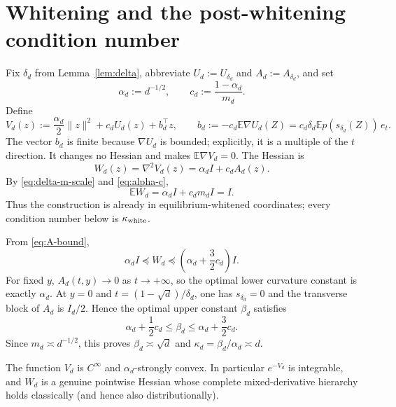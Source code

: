\documentclass[11pt]{article}
\numberwithin{equation}{section}
\newcommand{\E}{\mathbb E}
\begin{document}
\section{Whitening and the post-whitening condition number}

Fix $\delta_d$ from Lemma~\ref{lem:delta}, abbreviate
$U_d:=U_{\delta_d}$ and $A_d:=A_{\delta_d}$, and set
\begin{equation}\label{eq:alpha-c}
  \alpha_d:=d^{-1/2},
  \qquad
  c_d:=\frac{1-\alpha_d}{m_d}.
\end{equation}
Define
\begin{equation}\label{eq:Vdef}
  V_d(z):=\frac{\alpha_d}{2}\lVert z\rVert^2+c_dU_d(z)+b_d^\top z,
  \qquad
  b_d:=-c_d\E\nabla U_d(Z)
      =c_d\delta_d\E p(s_{\delta_d}(Z))\,e_t.
\end{equation}
The vector $b_d$ is finite because $\nabla U_d$ is bounded; explicitly, it
is a multiple of the $t$ direction.  It changes no Hessian and makes
$\E\nabla V_d=0$.  The Hessian is
\begin{equation}\label{eq:Wdef}
  W_d(z)=\nabla^2V_d(z)=\alpha_dI+c_dA_d(z).
\end{equation}
By \eqref{eq:delta-m-scale} and \eqref{eq:alpha-c},
\begin{equation}\label{eq:whitening}
  \E W_d=\alpha_dI+c_dm_dI=I.
\end{equation}
Thus the construction is already in equilibrium-whitened coordinates; every
condition number below is $\kappa_{\rm white}$.

From \eqref{eq:A-bound},
\begin{equation}\label{eq:W-upper}
  \alpha_dI\preceq W_d
  \preceq\left(\alpha_d+\frac32c_d\right)I.
\end{equation}
For fixed $y$, $A_d(t,y)\to0$ as $t\to+\infty$, so the optimal lower
curvature constant is exactly $\alpha_d$.  At $y=0$ and
$t=(1-\sqrt d)/\delta_d$, one has $s_{\delta_d}=0$ and the transverse block
of $A_d$ is $I_d/2$.  Hence the optimal upper constant $\beta_d$ satisfies
\begin{equation}\label{eq:beta-bounds}
  \alpha_d+\frac12c_d\le\beta_d
  \le\alpha_d+\frac32c_d.
\end{equation}
Since $m_d\asymp d^{-1/2}$, this proves
$\beta_d\asymp\sqrt d$ and $\kappa_d=\beta_d/\alpha_d\asymp d$.

The function $V_d$ is $C^\infty$ and $\alpha_d$-strongly convex.  In
particular $e^{-V_d}$ is integrable, and $W_d$ is a genuine pointwise Hessian
whose complete mixed-derivative hierarchy holds classically (and hence also
distributionally).
\end{document}
